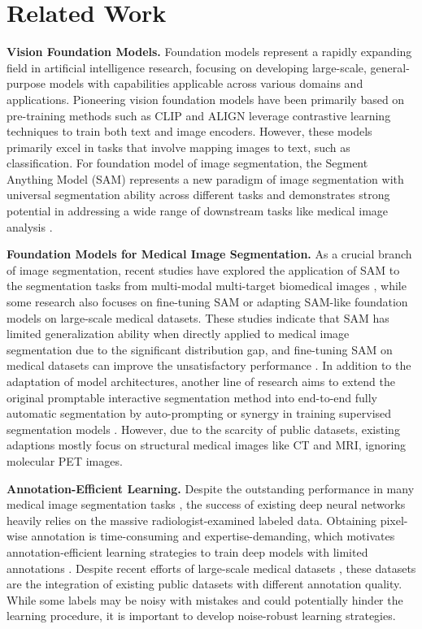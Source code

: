 \section{Related Work}
\label{sec:related}

\textbf{Vision Foundation Models.}
Foundation models represent a rapidly expanding field in artificial intelligence research, focusing on developing large-scale, general-purpose models with capabilities applicable across various domains and applications. Pioneering vision foundation models have been primarily based on pre-training methods such as CLIP \cite{CLIP} and ALIGN \cite{ALIGN} leverage contrastive learning techniques to train both text and image encoders. However, these models primarily excel in tasks that involve mapping images to text, such as classification.
For foundation model of image segmentation, the Segment Anything Model (SAM) \cite{SAM} represents a new paradigm of image segmentation with universal segmentation ability across different tasks and demonstrates strong potential in addressing a wide range of downstream tasks like medical image analysis \cite{zhang2024challenges,moor2023foundation}.

\textbf{Foundation Models for Medical Image Segmentation.}
As a crucial branch of image segmentation, recent studies have explored the application of SAM to the segmentation tasks from multi-modal multi-target biomedical images \cite{SAM-Empirical,SAM-SZU,ma2024segment}, while some research also focuses on fine-tuning SAM \cite{MedSAM} or adapting SAM-like foundation models \cite{SAM-Med3D,du2023segvol,wong2024scribbleprompt} on large-scale medical datasets. These studies indicate that SAM has limited generalization ability when directly applied to medical image segmentation due to the significant distribution gap, and fine-tuning SAM on medical datasets can improve the unsatisfactory performance \cite{SAM4MIS}.
In addition to the adaptation of model architectures, another line of research aims to extend the original promptable interactive segmentation method into end-to-end fully automatic segmentation by auto-prompting \cite{MedLSAM, UR-SAM} or synergy in training supervised segmentation models \cite{zhang2024semisam,li2023segment}.
However, due to the scarcity of public datasets, existing adaptions mostly focus on structural medical images like CT and MRI, ignoring molecular PET images. 


\textbf{Annotation-Efficient Learning.}
Despite the outstanding performance in many medical image segmentation tasks \cite{isensee2020nnunet,wasserthal2023totalsegmentator}, the success of existing deep neural networks heavily relies on the massive radiologist-examined labeled data.
Obtaining pixel-wise annotation is time-consuming and expertise-demanding, which motivates annotation-efficient learning strategies to train deep models with limited annotations \cite{cheplygina2019not,jiao2023learning,shi2024beyond}.
Despite recent efforts of large-scale medical datasets \cite{ye2023sa,bai2024m3d}, these datasets are the integration of existing public datasets with different annotation quality. While some labels may be noisy with mistakes and could potentially hinder the learning procedure, it is important to develop noise-robust learning strategies. 